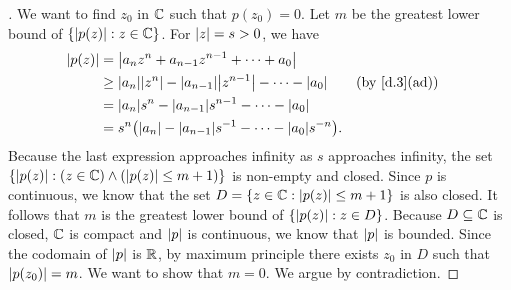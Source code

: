 \begin{proof}[]
	We want to find \(z_0\) in \(\mathbb{C}\) such that \(p(z_0) = 0\).
	Let \(m\) be the greatest lower bound of \(\left\lbrace\left\lvert p(z)\right\rvert : z \in \mathbb{C}\right\rbrace\).
	For \(\left\lvert z\right\rvert = s > 0\), we have
	\begin{align*}
		\abs{p(z)} & = \abs{a_n z^n + a_{n - 1} z^{n - 1} + \cdots + a_0}                                              \\
		           & \geq \abs{a_n} \abs{z^n} - \abs{a_{n - 1}} \abs{z^{n - 1}} - \cdots - \abs{a_0} &  & \by{d.3}[ad] \\
		           & = \abs{a_n} s^n - \abs{a_{n - 1}} s^{n - 1} - \cdots - \abs{a_0}                                  \\
		           & = s^{n} \pa{\abs{a_n} - \abs{a_{n - 1}} s^{-1} - \cdots - \abs{a_0} s^{-n}}.
	\end{align*}
	Because the last expression approaches infinity as \(s\) approaches infinity, the set \(\left\lbrace\left\lvert p(z)\right\rvert : (z \in \mathbb{C}) \land (\left\lvert p(z)\right\rvert \leq m + 1)\right\rbrace\) is non-empty and closed.
	Since \(p\) is continuous, we know that the set \(D = \left\lbrace z \in \mathbb{C} : \left\lvert p(z)\right\rvert \leq m + 1\right\rbrace\) is also closed.
	It follows that \(m\) is the greatest lower bound of \(\left\lbrace\left\lvert p(z)\right\rvert : z \in D\right\rbrace\).
	Because \(D \subseteq \mathbb{C}\) is closed, \(\mathbb{C}\) is compact and \(\left\lvert p\right\rvert\) is continuous, we know that \(\left\lvert p\right\rvert\) is bounded.
	Since the codomain of \(\left\lvert p\right\rvert\) is \(\mathbb{R}\), by maximum principle there exists \(z_0\) in \(D\) such that \(\left\lvert p(z_0)\right\rvert = m\).
	We want to show that \(m = 0\).
	We argue by contradiction.


\end{proof}
